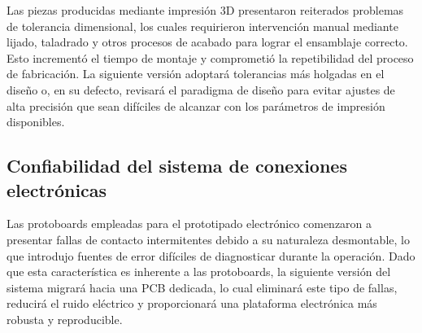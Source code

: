Las piezas producidas mediante impresión 3D presentaron reiterados problemas
de tolerancia dimensional, los cuales requirieron intervención manual mediante
lijado, taladrado y otros procesos de acabado para lograr el ensamblaje
correcto. Esto incrementó el tiempo de montaje y comprometió la repetibilidad
del proceso de fabricación. La siguiente versión adoptará tolerancias más
holgadas en el diseño o, en su defecto, revisará el paradigma de diseño para
evitar ajustes de alta precisión que sean difíciles de alcanzar con los
parámetros de impresión disponibles.

\subsection*{Confiabilidad del sistema de conexiones electrónicas}

Las protoboards empleadas para el prototipado electrónico comenzaron a
presentar fallas de contacto intermitentes debido a su naturaleza desmontable,
lo que introdujo fuentes de error difíciles de diagnosticar durante la
operación. Dado que esta característica es inherente a las protoboards, la
siguiente versión del sistema migrará hacia una PCB dedicada, lo cual
eliminará este tipo de fallas, reducirá el ruido eléctrico y proporcionará una
plataforma electrónica más robusta y reproducible.
